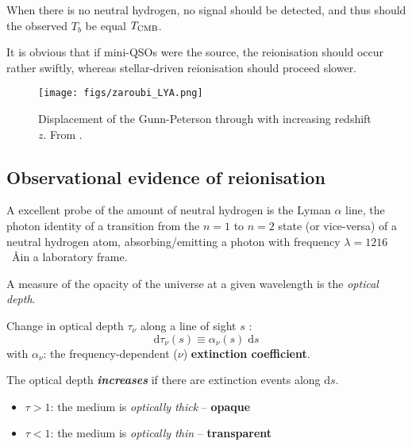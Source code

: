 \documentclass[noxcolor]{article}
\newcommand{\diff}{\ensuremath{\; \text{d}}}
\newcommand{\diffd}{\ensuremath{\text{d}}}
\begin{document}
When there is no neutral hydrogen, no signal should be detected, and thus should the observed $T_b$ be equal $T_{\rm CMB}$. 

It is obvious that if mini-QSOs were the source, the reionisation should occur rather swiftly, whereas stellar-driven reionisation should proceed slower.

\begin{frame}
    \begin{figure}[htb]
        \centering
        \texttt{[image: figs/zaroubi\_LYA.png]}
        \caption{Displacement of the Gunn-Peterson through with increasing redshift $z$. From .}
        \label{fig:2_LYA}
    \end{figure}

\end{frame}

\subsection{Observational evidence of reionisation}
A excellent probe of the amount of neutral hydrogen is the Lyman $\alpha$ line, the photon identity of a transition from the $n=1$ to $n=2$ state (or vice-versa) of a neutral hydrogen atom, absorbing/emitting a photon with frequency $\lambda = 1216$~\AA in a laboratory frame.

A measure of the opacity of the universe at a given wavelength is the \textit{optical depth}. 

\begin{frame}
    Change in optical depth $\tau_\nu$ along a line of sight $s$ :
    \begin{equation}
        \diffd \tau_\nu(s) \equiv \alpha_{\nu}(s) \diff s
        \label{eq:dtau}
    \end{equation}
    with $\alpha_\nu$: the frequency-dependent ($\nu$) \textbf{extinction coefficient}.

    The optical depth \textbf{\textit{increases}} if there are extinction events along $\diffd s$.

    \begin{itemize}
        \item $\tau > 1$: the medium is \textit{optically thick} -- \textbf{opaque}
        \item $\tau < 1$: the medium is \textit{optically thin} -- \textbf{transparent}
    \end{itemize}

\end{frame}
\end{document}
